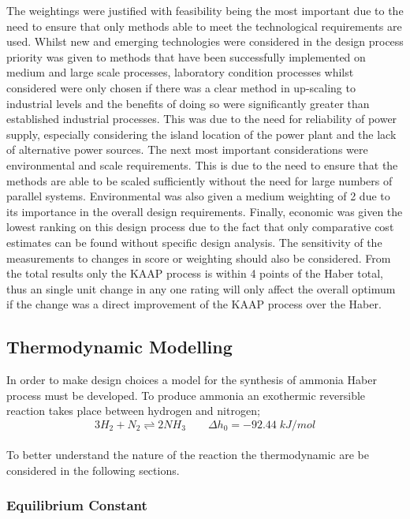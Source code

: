 The weightings were justified with feasibility being the most important due to the need to ensure that only methods able to meet the technological requirements are used. Whilst new and emerging technologies were considered in the design process priority was given to methods that have been successfully implemented on medium and large scale processes, laboratory condition processes whilst considered were only chosen if there was a clear method in up-scaling to industrial levels and the benefits of doing so were significantly greater than established industrial processes. This was due to the need for reliability of power supply, especially considering the island location of the power plant and the lack of alternative power sources. The next most important considerations were environmental and scale requirements. This is due to the need to ensure that the methods are able to be scaled sufficiently without the need for large numbers of parallel systems. Environmental was also given a medium weighting of 2 due to its importance in the overall design requirements. Finally, economic was given the lowest ranking on this design process due to the fact that only comparative cost estimates can be found without specific design analysis. The sensitivity of the measurements to changes in score or weighting should also be considered. From the total results only the KAAP process is within 4 points of the Haber total, thus an single unit change in any one rating will only affect the overall optimum if the change was a direct improvement of the KAAP process over the Haber.

\subsection{Thermodynamic Modelling}
In order to make design choices a model for the synthesis of ammonia Haber process must be developed. To produce ammonia an exothermic reversible reaction takes place between hydrogen and nitrogen;
\begin{equation}
3H_2+N_2   \underset{ }{\stackrel{ }{\rightleftharpoons}}   2NH_3 \qquad \Delta h_0 = -92.44 \; kJ/mol 
\end{equation}

To better understand the nature of the reaction the thermodynamic are be considered in the following sections.


\subsubsection{Equilibrium Constant}

